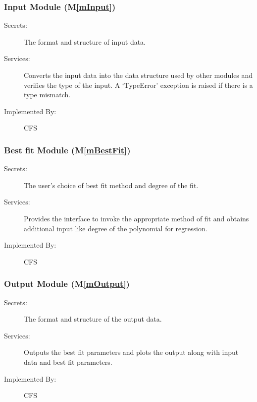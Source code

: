 \documentclass[12pt, titlepage]{article}
\newcommand{\mref}[1]{M\ref{#1}}
\newcommand{\famname}{CFS} %
\begin{document}
\subsubsection{Input Module (\mref{mInput})}

\begin{description}
	\item[Secrets:]The format and structure of input data.
	\item[Services:]Converts the input data into the data structure used by
          other modules and verifies the type of the input. A `TypeError'
          exception is raised if there is a type mismatch.
	\item[Implemented By:] \famname{}
\end{description}

\subsubsection{Best fit Module (\mref{mBestFit})}

\begin{description}
	\item[Secrets:]The user's choice of best fit method and degree of the fit.
	\item[Services:] Provides the interface to invoke the appropriate method
          of fit and obtains additional input like degree of the polynomial for
          regression.
	\item[Implemented By:] \famname{}
\end{description}


\subsubsection{Output Module (\mref{mOutput})}

\begin{description}
	\item[Secrets:] The format and structure of the output data.
	\item[Services:] Outputs the best fit parameters and plots the output
          along with input data and best fit parameters.
	\item[Implemented By:] \famname{}
\end{description} 
\end{document}
